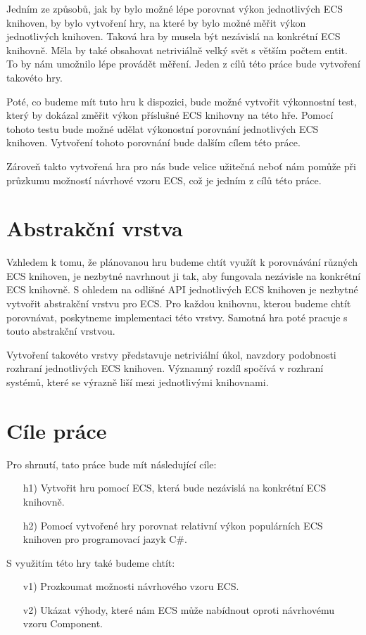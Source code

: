 Jedním ze způsobů, jak by bylo možné lépe porovnat výkon jednotlivých ECS knihoven, by bylo vytvoření hry, na které by bylo možné měřit výkon jednotlivých knihoven. Taková hra by musela být nezávislá na konkrétní ECS knihovně. Měla by také obsahovat netriviálně velký svět s větším počtem entit. To by nám umožnilo lépe provádět měření. Jeden z cílů této práce bude vytvoření takovéto hry.

Poté, co budeme mít tuto hru k dispozici, bude možné vytvořit výkonnostní test, který by dokázal změřit výkon příslušné ECS knihovny na této hře. Pomocí tohoto testu bude možné udělat výkonostní porovnání jednotlivých ECS knihoven. Vytvoření tohoto porovnání bude dalším cílem této práce.

Zároveň takto vytvořená hra pro nás bude velice užitečná neboť nám pomůže při průzkumu možností návrhové vzoru ECS, což je jedním z cílů této práce.

\section{Abstrakční vrstva}
Vzhledem k tomu, že plánovanou hru budeme chtít využít k porovnávání různých ECS knihoven, je nezbytné navrhnout ji tak, aby fungovala nezávisle na konkrétní ECS knihovně. S ohledem na odlišné API jednotlivých ECS knihoven je nezbytné vytvořit abstrakční vrstvu pro ECS. Pro každou knihovnu, kterou budeme chtít porovnávat, poskytneme implementaci této vrstvy. Samotná hra poté pracuje s touto abstrakční vrstvou.

Vytvoření takovéto vrstvy představuje netriviální úkol, navzdory podobnosti rozhraní jednotlivých ECS knihoven. Významný rozdíl spočívá v rozhraní systémů, které se výrazně liší mezi jednotlivými knihovnami.

\section{Cíle práce}
Pro shrnutí, tato práce bude mít následující cíle:
\begin{enumerate}
    \item[h1)] Vytvořit hru pomocí ECS, která bude nezávislá na konkrétní ECS knihovně.
    \item[h2)] Pomocí vytvořené hry porovnat relativní výkon populárních ECS knihoven pro programovací jazyk C\#.
\end{enumerate}
S využitím této hry také budeme chtít:
\begin{enumerate}
    \item[v1)] Prozkoumat možnosti návrhového vzoru ECS.
    \item[v2)] Ukázat výhody, které nám ECS může nabídnout oproti návrhovému vzoru Component.
\end{enumerate}














